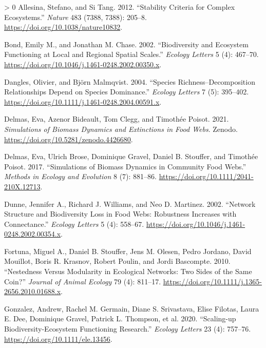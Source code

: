 \documentclass[10pt,oneside]{article}
\newlength{\cslhangindent}
\newenvironment{CSLReferences}[3] %
 {%
  \setlength{\parindent}{0pt}
  \ifodd #1 \everypar{\setlength{\hangindent}{\cslhangindent}}\ignorespaces\fi
  \ifnum #2 > 0
  \setlength{\parskip}{#2\baselineskip}
  \fi
 }%
 {}
\begin{document}
\hypertarget{refs}{}
\begin{CSLReferences}{1}{0}
\leavevmode\hypertarget{ref-Allesina2012StaCrib}{}%
Allesina, Stefano, and Si Tang. 2012. {``Stability Criteria for Complex
Ecosystems.''} \emph{Nature} 483 (7388, 7388): 205--8.
\url{https://doi.org/10.1038/nature10832}.

\leavevmode\hypertarget{ref-Bond2002BioEco}{}%
Bond, Emily M., and Jonathan M. Chase. 2002. {``Biodiversity and
Ecosystem Functioning at Local and Regional Spatial Scales.''}
\emph{Ecology Letters} 5 (4): 467--70.
\url{https://doi.org/10.1046/j.1461-0248.2002.00350.x}.

\leavevmode\hypertarget{ref-Dangles2004SpeRic}{}%
Dangles, Olivier, and Björn Malmqvist. 2004. {``Species
Richness--Decomposition Relationships Depend on Species Dominance.''}
\emph{Ecology Letters} 7 (5): 395--402.
\url{https://doi.org/10.1111/j.1461-0248.2004.00591.x}.

\leavevmode\hypertarget{ref-Delmas2021SimBio}{}%
Delmas, Eva, Azenor Bideault, Tom Clegg, and Timothée Poisot. 2021.
\emph{Simulations of Biomass Dynamics and Extinctions in Food Webs}.
Zenodo. \url{https://doi.org/10.5281/zenodo.4426680}.

\leavevmode\hypertarget{ref-Delmas2017SimBio}{}%
Delmas, Eva, Ulrich Brose, Dominique Gravel, Daniel B. Stouffer, and
Timothée Poisot. 2017. {``Simulations of Biomass Dynamics in Community
Food Webs.''} \emph{Methods in Ecology and Evolution} 8 (7): 881--86.
\url{https://doi.org/10.1111/2041-210X.12713}.

\leavevmode\hypertarget{ref-Dunne2002NetStr}{}%
Dunne, Jennifer A., Richard J. Williams, and Neo D. Martinez. 2002.
{``Network Structure and Biodiversity Loss in Food Webs: Robustness
Increases with Connectance.''} \emph{Ecology Letters} 5 (4): 558--67.
\url{https://doi.org/10.1046/j.1461-0248.2002.00354.x}.

\leavevmode\hypertarget{ref-Fortuna2010NesModa}{}%
Fortuna, Miguel A., Daniel B. Stouffer, Jens M. Olesen, Pedro Jordano,
David Mouillot, Boris R. Krasnov, Robert Poulin, and Jordi Bascompte.
2010. {``Nestedness Versus Modularity in Ecological Networks: Two Sides
of the Same Coin?''} \emph{Journal of Animal Ecology} 79 (4): 811--17.
\url{https://doi.org/10.1111/j.1365-2656.2010.01688.x}.

\leavevmode\hypertarget{ref-Gonzalez2020ScaBio}{}%
Gonzalez, Andrew, Rachel M. Germain, Diane S. Srivastava, Elise Filotas,
Laura E. Dee, Dominique Gravel, Patrick L. Thompson, et al. 2020.
{``Scaling-up Biodiversity-Ecosystem Functioning Research.''}
\emph{Ecology Letters} 23 (4): 757--76.
\url{https://doi.org/10.1111/ele.13456}.


\end{CSLReferences}
\end{document}
